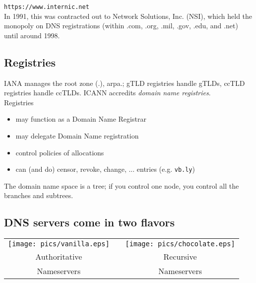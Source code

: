 \documentclass[xga]{xdvislides}
\begin{document}
{\tt https://www.internic.net} \\

In 1991, this was contracted out to Network Solutions,
Inc. (NSI), which held the monopoly on DNS
registrations (within .com, .org, .mil, .gov, .edu, and
.net) until around 1998. \\


\subsection{Registries}
IANA manages the root zone (.), arpa.; gTLD registries
handle gTLDs, ccTLD registries handle ccTLDs.  ICANN
accredits {\em domain name registries}. \\

Registries
\begin{itemize}
	\item may function as a Domain Name Registrar
	\item may delegate Domain Name registration
	\item control policies of allocations
	\item can (and do) censor, revoke, change, ... entries (e.g. {\tt vb.ly})
\end{itemize}

\vspace{.5in}
The domain name space is a tree; if you control one
node, you control all the branches and subtrees.

\subsection{DNS servers come in two flavors}
\vspace*{\fill}
\begin{center}
	\begin{tabular}{ c c c }
	\texttt{[image: pics/vanilla.eps]} & \hspace{.5in} & \texttt{[image: pics/chocolate.eps]} \\
	\hspace{.3in} \Huge Authoritative & & \hspace{.3in} \Huge Recursive \\
	\hspace{.3in} \Huge Nameservers & & \hspace{.3in} \Huge Nameservers \\
	\end{tabular}
\end{center}
\vspace*{\fill}
\end{document}
